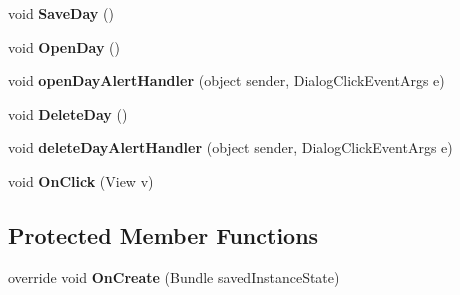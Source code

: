 \begin{DoxyCompactItemize}
\item 
void {\bfseries Save\+Day} ()\hypertarget{class_w_c_c_mobile_1_1_course_activity_a7562e44ddd13638257c79cbe0e607a92}{}\label{class_w_c_c_mobile_1_1_course_activity_a7562e44ddd13638257c79cbe0e607a92}

\item 
void {\bfseries Open\+Day} ()\hypertarget{class_w_c_c_mobile_1_1_course_activity_a4e9ca8143284a6cc6d465bfcf7584ea2}{}\label{class_w_c_c_mobile_1_1_course_activity_a4e9ca8143284a6cc6d465bfcf7584ea2}

\item 
void {\bfseries open\+Day\+Alert\+Handler} (object sender, Dialog\+Click\+Event\+Args e)\hypertarget{class_w_c_c_mobile_1_1_course_activity_a3f60722ba489ba2375eab1c0dfcce310}{}\label{class_w_c_c_mobile_1_1_course_activity_a3f60722ba489ba2375eab1c0dfcce310}

\item 
void {\bfseries Delete\+Day} ()\hypertarget{class_w_c_c_mobile_1_1_course_activity_abe497f8f32f3c06c9a6ab92269033af7}{}\label{class_w_c_c_mobile_1_1_course_activity_abe497f8f32f3c06c9a6ab92269033af7}

\item 
void {\bfseries delete\+Day\+Alert\+Handler} (object sender, Dialog\+Click\+Event\+Args e)\hypertarget{class_w_c_c_mobile_1_1_course_activity_ae291e7fc41929f0a7c2c63a167b5a2ad}{}\label{class_w_c_c_mobile_1_1_course_activity_ae291e7fc41929f0a7c2c63a167b5a2ad}

\item 
void {\bfseries On\+Click} (View v)\hypertarget{class_w_c_c_mobile_1_1_course_activity_a1927be1b7a214bc605a1398d4377f460}{}\label{class_w_c_c_mobile_1_1_course_activity_a1927be1b7a214bc605a1398d4377f460}

\end{DoxyCompactItemize}
\subsection*{Protected Member Functions}
\begin{DoxyCompactItemize}
\item 
override void {\bfseries On\+Create} (Bundle saved\+Instance\+State)\hypertarget{class_w_c_c_mobile_1_1_course_activity_a5094d8dad8b79ba3e929c51773f17033}{}\label{class_w_c_c_mobile_1_1_course_activity_a5094d8dad8b79ba3e929c51773f17033}

\end{DoxyCompactItemize}
